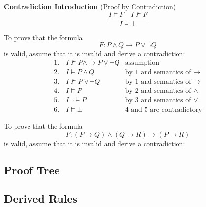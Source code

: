 \begin{center}
\textbf{Contradiction Introduction} (Proof by Contradiction) \[
\frac{I\models F\quad I\not\models F}{I\models\bot}
\]
\end{center}
\begin{example}
	To prove that the formula \[
	F:P\land Q\to P\lor\lnot Q
	\] is valid, assume that it is invalid and derive a contradiction:
	\[
	\begin{array}{ll}
		1.\quad I\not\models P\land \to P\lor\lnot Q & \text{assumption} \\
		2.\quad I\models P\land Q & \text{by 1 and semantics of $\to$} \\
		3.\quad I\not\models P\lor \lnot Q & \text{by 1 and semantics of $\to$} \\
		4.\quad I\models P & \text{by 2 and semantics of $\land$} \\
		5.\quad I\lnot\models P & \text{by 3 and semantics of $\lor$} \\
		6.\quad I\models\bot & \text{4 and 5 are contradictory}
	\end{array}
	\]
\end{example}

\begin{example}
	To prove that the formula \[
	F:(P\to Q)\land(Q\to R)\to(P\to R)
	\] is valid, assume that it is invalid and derive a contradiction:
\end{example}

\subsection{Proof Tree}

\subsection{Derived Rules}


